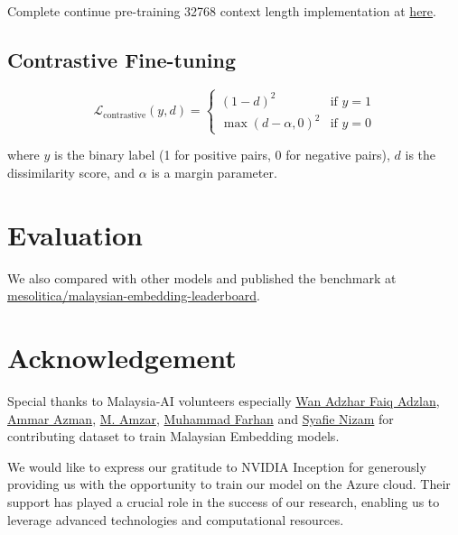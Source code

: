 \documentclass[preprint]{article}
\begin{document}
Complete continue pre-training 32768 context length implementation at \href{https://github.com/mesolitica/malaya/tree/5.1/session/llama2#600m-32768-context-length-flash-attention-2}{here}.

\subsection{Contrastive Fine-tuning}

\begin{equation}
  \mathcal{L}_{\text{contrastive}}(y, d) = \begin{cases}
    (1 - d)^2             & \text{if } y = 1 \\
    \max(d - \alpha, 0)^2 & \text{if } y = 0
  \end{cases}
\end{equation}

where $y$ is the binary label (1 for positive pairs, 0 for negative pairs), $d$ is the dissimilarity score, and $\alpha$ is a margin parameter.

\section{Evaluation}

We also compared with other models and published the benchmark at \href{https://huggingface.co/spaces/mesolitica/malaysian-embedding-leaderboard}{mesolitica/malaysian-embedding-leaderboard}.

\section{Acknowledgement}

Special thanks to Malaysia-AI volunteers especially \href{https://www.linkedin.com/in/wan-adzhar-faiq-adzlan-19a27baa/}{Wan Adzhar Faiq Adzlan}, \href{https://www.linkedin.com/in/ammar-azman/}{Ammar Azman}, \href{https://www.linkedin.com/in/amzar96/}{M. Amzar}, \href{https://www.linkedin.com/in/muhammad-farhan-helmy-0529501a7/}{Muhammad Farhan} and \href{https://www.linkedin.com/in/syafie-nizam/}{Syafie Nizam} for contributing dataset to train Malaysian Embedding models.

We would like to express our gratitude to NVIDIA Inception for generously providing us with the opportunity to train our model on the Azure cloud. Their support has played a crucial role in the success of our research, enabling us to leverage advanced technologies and computational resources.
\end{document}
